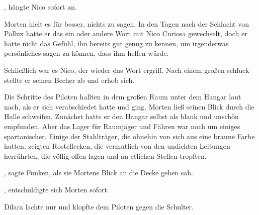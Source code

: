 , hängte Nico sofort an. 

\par

Morten hielt es für besser, nichts zu sagen. In den Tagen nach der Schlacht von Pollux hatte er das ein oder andere Wort mit Nico Curiosa gewechselt, doch er hatte nicht das Gefühl, ihn bereits gut genug zu kennen, um irgendetwas persönliches sagen zu können, dass ihm helfen würde.

\par

Schließlich war es Nico, der wieder das Wort ergriff.   Nach einem großen schluck stellte er seinen Becher ab und erhob sich. 

\par

Die Schritte des Piloten hallten in dem großen Raum unter dem Hangar laut nach, als er sich verabschiedet hatte und ging. Morten ließ seinen Blick durch die Halle schweifen. Zunächst hatte er den Hangar selbst als blank und unschön empfunden. Aber das Lager für Raumjäger und Fähren war noch um einiges spartanischer. Einige der Stahlträger, die ohnehin von sich aus eine braune Farbe hatten, zeigten Rosteflecken, die vermutlich von den undichten Leitungen herrührten, die völlig offen lagen und an etlichen Stellen tropften.

\par

, sagte Funken, als sie Mortens Blick an die Decke gehen sah. 

\par

,  entschuldigte sich Morten sofort.

\par

Dilara lachte nur und klopfte dem Piloten gegen die Schulter. 

